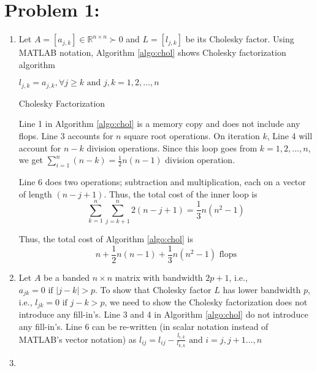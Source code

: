 \section*{Problem 1:}
\begin{enumerate}
\item Let $A = [a_{j,k}] \in \mathbb{R}^{n\times n} \succ 0$ and $L = [l_{j,k}]$ be its Cholesky factor. Using MATLAB notation, Algorithm \ref{algo:chol} shows Cholesky factorization algorithm

\begin{algorithm}[H]
\SetAlgoLined
{}
 $l_{j,k} = a_{j,k}, \forall j\geq k \text{\ and\ }  j,k= 1,2, \ldots, n$ \\
 \caption{Cholesky Factorization}
\label{algo:chol}
\end{algorithm}

\noindent Line 1 in Algorithm \ref{algo:chol} is a memory copy and does not include any flops. Line 3 accounts for $n$ square root operations. On iteration $k$, Line 4 will account for $n-k$ division operations. Since this loop goes from $k= 1,2, \ldots, n $, we get $\sum_{i=1}^{n}(n-k) = \frac{1}{2}n(n-1)$ division operation.

\noindent Line 6 does two operations; subtraction and multiplication, each on a vector of length $(n-j+1)$. Thus, the total cost of the inner loop is 
$$
\sum_{k=1}^{n} \sum_{j=k+1}^{n} 2(n-j+1) = \frac{1}{3}n(n^{2}-1)
$$

Thus, the total cost of Algorithm \ref{algo:chol} is 
$$
n + \frac{1}{2}n(n-1) + \frac{1}{3}n(n^2-1) \text{\ flops}
$$

\item 
Let $A$ be a banded $n\times n$ matrix with bandwidth $2p+1$, i.e., $a_{jk}=0 \text{\ if\ } |j-k|>p$. To show that Cholesky factor $L$ has lower bandwidth $p$, i.e.,  $l_{jk}=0 \text{\ if\ } j-k>p$, we need to show the Cholesky factorization does not introduce any fill-in's. Line 3 and 4 in Algorithm \ref{algo:chol} do not introduce any fill-in's. Line 6 can be re-written (in scalar notation instead of MATLAB's vector notation) as 
$
l_{ij} = l_{ij} - \frac{l_{i,k}}{l_{k,k}} \text{\ and \ } i= j, j+1 \ldots, n
$


 
\item 
\end{enumerate}